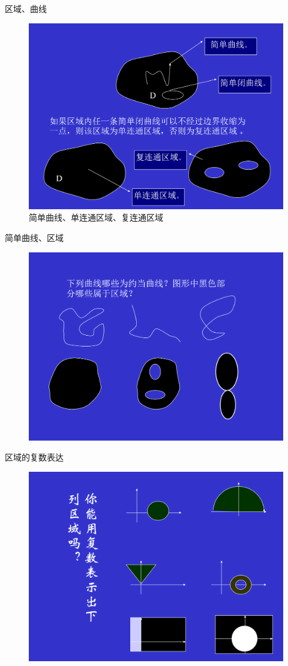 \documentclass[11pt]{beamer}
\begin{document}
\begin{frame}{区域、曲线}
\begin{figure}
	\centering
	\includegraphics[width=0.7\linewidth]{chap1_04}
	\caption{简单曲线、单连通区域、复连通区域}
	\label{fig:chap104}
\end{figure}

\end{frame}

\begin{frame}{简单曲线、区域}
\begin{figure}
	\centering
	\includegraphics[width=0.7\linewidth]{chap1_05}
	\label{fig:chap105}
\end{figure}
\end{frame}

\begin{frame}{区域的复数表达}
\begin{figure}
	\centering
	\includegraphics[width=0.7\linewidth]{chap1_06}
	\label{fig:chap106}
\end{figure}
\end{frame}
\end{document}

